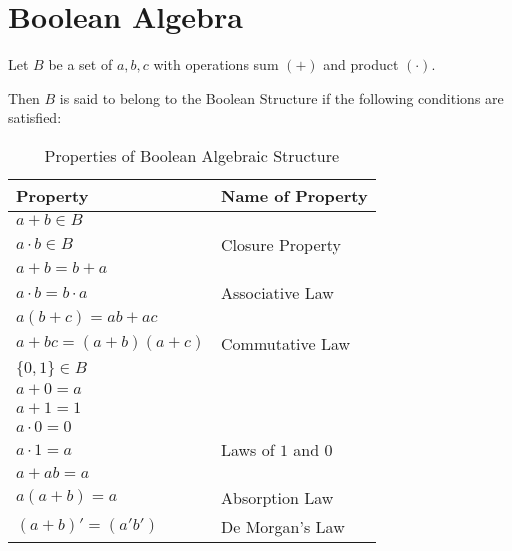 \chapter{Boolean Algebra}
Let $B$ be a set of $a,b,c$ with operations sum $(+)$ and product $(\cdot)$.

Then $B$ is said to belong to the Boolean Structure if the following conditions are satisfied:
\begin{table}[htbp]
	\centering
	\begin{tabular}{l l}
		\toprule
		Property & Name of Property\\
		\midrule
		$a+b \in B$ & \\
		$a \cdot b \in B$ & Closure Property\\

		\midrule[0.05pt]
		$a+b=b+a$ &\\
		$a \cdot b= b \cdot a$ & Associative Law\\

		\midrule[0.05pt]
		$a(b+c) = ab + ac $ & \\
		$a+bc=(a+b)(a+c)$ & Commutative Law\\

		\midrule[0.05pt]
		$\lbrace 0,1 \rbrace \in B$ & \\
		$a+0=a$ & \\
		$a+1=1$ & \\
		$a \cdot 0=0$ & \\
		$a \cdot 1=a$ & Laws of $1$ and $0$\\

		\midrule[0.05pt]
		$a+ab=a$ & \\
		$a(a+b)=a$ & Absorption Law\\

		\midrule[0.1pt]
		$(a+b)'=(a'b')$ & De Morgan's Law\\
		\bottomrule
	\end{tabular}
	\caption{Properties of Boolean Algebraic Structure}
	\label{boolean}
\end{table}
